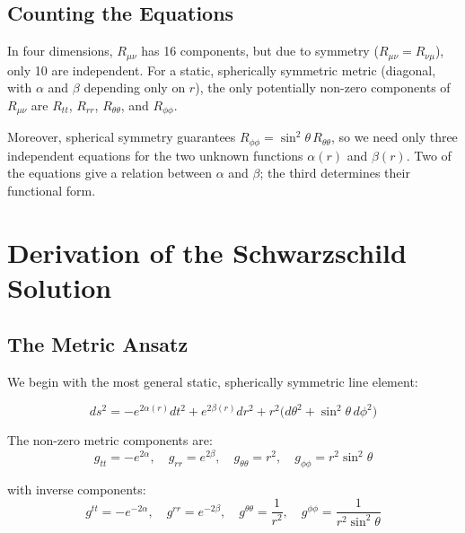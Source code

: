 \documentclass[12pt]{article}
\theoremstyle{definition}
\theoremstyle{remark}
\begin{document}
\subsection{Counting the Equations}

In four dimensions, $R_{\mu\nu}$ has 16 components, but due to symmetry ($R_{\mu\nu} = R_{\nu\mu}$), only 10 are independent. For a static, spherically symmetric metric (diagonal, with $\alpha$ and $\beta$ depending only on $r$), the only potentially non-zero components of $R_{\mu\nu}$ are $R_{tt}$, $R_{rr}$, $R_{\theta\theta}$, and $R_{\phi\phi}$.

Moreover, spherical symmetry guarantees $R_{\phi\phi} = \sin^{2}\theta\,R_{\theta\theta}$, so we need only three independent equations for the two unknown functions $\alpha(r)$ and $\beta(r)$. Two of the equations give a relation between $\alpha$ and $\beta$; the third determines their functional form.

\section{Derivation of the Schwarzschild Solution}

\subsection{The Metric Ansatz}

We begin with the most general static, spherically symmetric line element:

\begin{equation}\label{eq:ansatz}
  ds^{2} = -e^{2\alpha(r)}dt^{2} + e^{2\beta(r)}dr^{2} + r^{2}\big(d\theta^{2} + \sin^{2}\theta\,d\phi^{2}\big)
\end{equation}

The non-zero metric components are:
\begin{equation}
  g_{tt} = -e^{2\alpha},\quad
  g_{rr} = e^{2\beta},\quad
  g_{\theta\theta} = r^{2},\quad
  g_{\phi\phi} = r^{2}\sin^{2}\theta
\end{equation}

with inverse components:
\begin{equation}
  g^{tt} = -e^{-2\alpha},\quad
  g^{rr} = e^{-2\beta},\quad
  g^{\theta\theta} = \frac{1}{r^{2}},\quad
  g^{\phi\phi} = \frac{1}{r^{2}\sin^{2}\theta}
\end{equation}
\end{document}
